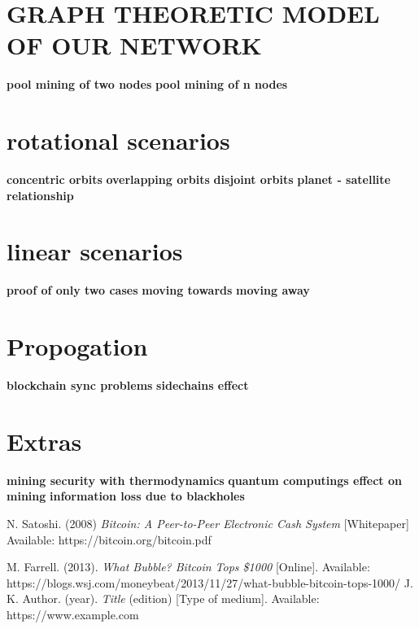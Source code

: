 \documentclass[conference]{IEEEtran}
\begin{document}
\section{GRAPH THEORETIC MODEL OF OUR NETWORK}
\lipsum[1-2]
\textbf{pool mining of two nodes}
\lipsum[1-2]
\textbf{pool mining of n nodes}
\lipsum[1-2]

\section{rotational scenarios}
\textbf{concentric orbits}
\lipsum[1-2]
\textbf{overlapping orbits}
\lipsum[1-2]
\textbf{disjoint orbits}
\lipsum[1-2]
\textbf{planet - satellite relationship}
\lipsum[1-2]

\section{linear scenarios}
\textbf{proof of only two cases}
\lipsum[1-2]
\textbf{moving towards}
\lipsum[1-2]
\textbf{moving away}
\lipsum[1-2]
\section{Propogation}
\textbf{blockchain sync problems}
\lipsum[1-2]
\textbf{sidechains effect}
\lipsum[1-2]

\section{Extras}
\textbf{mining security with thermodynamics}
\lipsum[1-2]
\textbf{quantum computings effect on mining}
\lipsum[1-2]
\textbf{information loss due to blackholes}
\lipsum[1-2]


\begin{thebibliography}{9}
	
	N. Satoshi. 
	(2008)
	\textit{Bitcoin: A Peer-to-Peer Electronic Cash System}
	[Whitepaper]
	Available: https://bitcoin.org/bitcoin.pdf

	M. Farrell. 
	(2013).	
	\textit{What Bubble? Bitcoin Tops \$1000}
	[Online].
	Available: https://blogs.wsj.com/moneybeat/2013/11/27/what-bubble-bitcoin-tops-1000/
	J. K. Author. 
	(year).	
	\textit{Title}
	(edition)
	[Type of medium].
	Available: https://www.example.com
\end{thebibliography}
\end{document}
